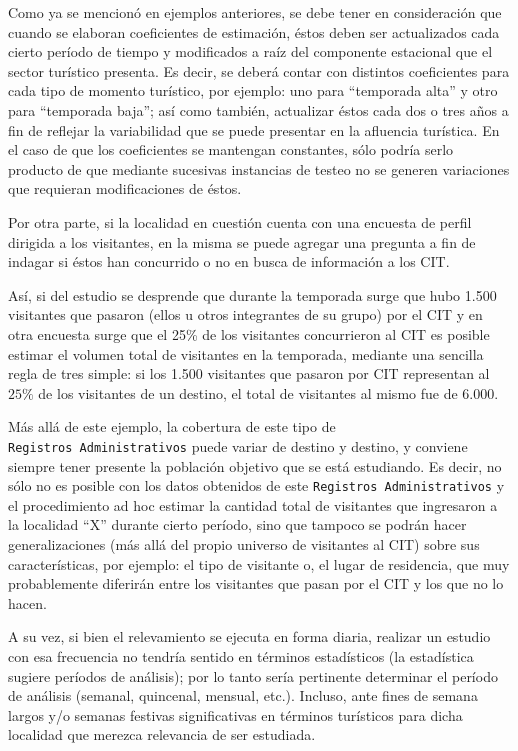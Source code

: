 \documentclass[
]{book}
\begin{document}
Como ya se mencionó en ejemplos anteriores, se debe tener en consideración que cuando se elaboran coeficientes de estimación, éstos deben ser actualizados cada cierto período de tiempo y modificados a raíz del componente estacional que el sector turístico presenta. Es decir, se deberá contar con distintos coeficientes para cada tipo de momento turístico, por ejemplo: uno para ``temporada alta'' y otro para ``temporada baja''; así como también, actualizar éstos cada dos o tres años a fin de reflejar la variabilidad que se puede presentar en la afluencia turística. En el caso de que los coeficientes se mantengan constantes, sólo podría serlo producto de que mediante sucesivas instancias de testeo no se generen variaciones que requieran modificaciones de éstos.

Por otra parte, si la localidad en cuestión cuenta con una encuesta de perfil dirigida a los visitantes, en la misma se puede agregar una pregunta a fin de indagar si éstos han concurrido o no en busca de información a los CIT.

Así, si del estudio se desprende que durante la temporada surge que hubo 1.500 visitantes que pasaron (ellos u otros integrantes de su grupo) por el CIT y en otra encuesta surge que el 25\% de los visitantes concurrieron al CIT es posible estimar el volumen total de visitantes en la temporada, mediante una sencilla regla de tres simple: si los 1.500 visitantes que pasaron por CIT representan al \(25\%\) de los visitantes de un destino, el total de visitantes al mismo fue de 6.000.

Más allá de este ejemplo, la cobertura de este tipo de \texttt{Registros\ Administrativos} puede variar de destino y destino, y conviene siempre tener presente la población objetivo que se está estudiando. Es decir, no sólo no es posible con los datos obtenidos de este \texttt{Registros\ Administrativos} y el procedimiento ad hoc estimar la cantidad total de visitantes que ingresaron a la localidad ``X'' durante cierto período, sino que tampoco se podrán hacer generalizaciones (más allá del propio universo de visitantes al CIT) sobre sus características, por ejemplo: el tipo de visitante o, el lugar de residencia, que muy probablemente diferirán entre los visitantes que pasan por el CIT y los que no lo hacen.

A su vez, si bien el relevamiento se ejecuta en forma diaria, realizar un estudio con esa frecuencia no tendría sentido en términos estadísticos (la estadística sugiere períodos de análisis); por lo tanto sería pertinente determinar el período de análisis (semanal, quincenal, mensual, etc.). Incluso, ante fines de semana largos y/o semanas festivas significativas en términos turísticos para dicha localidad que merezca relevancia de ser estudiada.
\end{document}

